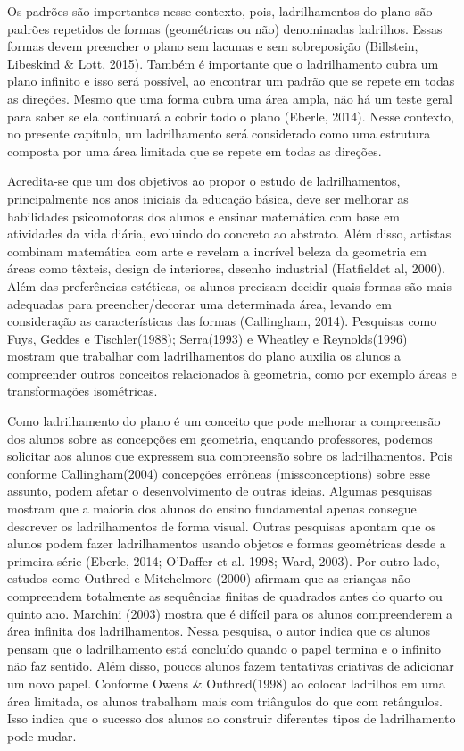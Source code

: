 \begin{apresentacao}
Os padrões são importantes nesse contexto, pois, ladrilhamentos do plano são padrões repetidos de formas (geométricas ou não) denominadas ladrilhos. Essas formas devem preencher o plano sem lacunas e sem sobreposição (Billstein, Libeskind \& Lott, 2015). Também é importante que o ladrilhamento cubra  um plano infinito e isso será  possível, ao encontrar um padrão que se repete em todas as direções. Mesmo que uma forma cubra uma área ampla, não há um teste geral para saber se ela continuará a cobrir todo o plano (Eberle, 2014). Nesse contexto, no  presente capítulo, um ladrilhamento  será considerado como uma estrutura composta por uma área limitada que se repete em todas as direções. 

Acredita-se que um dos  objetivos ao propor o estudo de ladrilhamentos, principalmente nos anos iniciais da educação básica, deve ser melhorar as habilidades psicomotoras dos alunos e ensinar matemática com base em  atividades da vida diária, evoluindo do concreto ao abstrato. Além disso, artistas combinam matemática com arte e revelam a incrível beleza da geometria em áreas como têxteis, design de interiores, desenho industrial (Hatfieldet al, 2000). Além das preferências estéticas, os alunos precisam decidir quais formas são mais adequadas para preencher/decorar uma determinada área, levando em consideração as características das formas (Callingham, 2014). Pesquisas como Fuys, Geddes e Tischler(1988); Serra(1993) e  Wheatley e Reynolds(1996) mostram que trabalhar com ladrilhamentos do plano auxilia os alunos a compreender outros conceitos relacionados à geometria, como por exemplo áreas e transformações isométricas.  

Como ladrilhamento do plano é um conceito que pode melhorar a compreensão dos alunos sobre as concepções em geometria,  enquando professores, podemos  solicitar aos alunos que expressem sua compreensão sobre os ladrilhamentos. Pois conforme Callingham(2004) concepções errôneas (missconceptions)  sobre esse assunto, podem afetar o desenvolvimento de outras ideias. Algumas pesquisas mostram que a maioria dos alunos do ensino fundamental apenas consegue descrever os ladrilhamentos de forma visual. Outras pesquisas apontam que os alunos podem fazer ladrilhamentos  usando objetos e formas geométricas desde a primeira série (Eberle, 2014; O'Daffer et al. 1998; Ward, 2003). Por outro lado, estudos como Outhred e Mitchelmore (2000) afirmam que as crianças não compreendem totalmente as sequências finitas de quadrados antes do quarto ou quinto ano. Marchini (2003) mostra que é  difícil para os alunos compreenderem a área infinita dos ladrilhamentos. Nessa pesquisa, o autor indica que os alunos pensam que o ladrilhamento está concluído quando o papel termina e o infinito não faz sentido. Além disso,  poucos alunos fazem tentativas criativas de adicionar um novo papel. Conforme Owens \& Outhred(1998) ao colocar ladrilhos em uma área limitada, os alunos trabalham mais com triângulos do que com retângulos. Isso indica que o sucesso dos alunos ao construir diferentes tipos de ladrilhamento  pode mudar.


\end{apresentacao}
